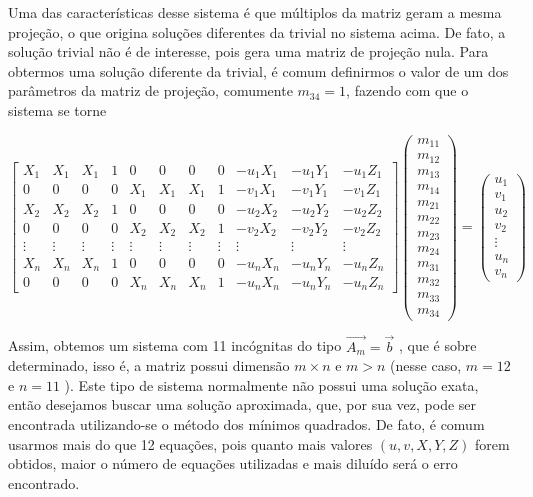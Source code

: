 \documentclass[ecp,tc]{iiufrgs}
\begin{document}
Uma das características desse sistema é que múltiplos da matriz geram a mesma projeção, o que origina soluções diferentes da trivial no sistema acima. De fato, a solução trivial não é de interesse, pois gera uma matriz de projeção nula. Para obtermos uma solução diferente da trivial, é comum definirmos o valor de um dos parâmetros da matriz de projeção, comumente $ m_{34} = 1 $, fazendo com que o sistema se torne

\[
\begin{bmatrix}
X_1 & X_1 & X_1 & 1 & 0 & 0 & 0 & 0 & -u_1X_1 & -u_1Y_1 & -u_1Z_1 \\
0 & 0 & 0 & 0 & X_1 & X_1 & X_1 & 1 & -v_1X_1 & -v_1Y_1 & -v_1Z_1 \\
X_2 & X_2 & X_2 & 1 & 0 & 0 & 0 & 0 & -u_2X_2 & -u_2Y_2 & -u_2Z_2 \\
0 & 0 & 0 & 0 & X_2 & X_2 & X_2 & 1 & -v_2X_2 & -v_2Y_2 & -v_2Z_2 \\
\vdots & \vdots & \vdots & \vdots & \vdots & \vdots & \vdots & \vdots & \vdots & \vdots & \vdots \\
X_n & X_n & X_n & 1 & 0 & 0 & 0 & 0 & -u_nX_n & -u_nY_n & -u_nZ_n \\
0 & 0 & 0 & 0 & X_n & X_n & X_n & 1 & -u_nX_n & -u_nY_n & -u_nZ_n 
\end{bmatrix}
\begin{pmatrix}m_{11} \\ m_{12} \\ m_{13} \\ m_{14} \\ m_{21} \\ m_{22} \\ m_{23} \\ m_{24} \\ m_{31} \\ m_{32} \\ m_{33} \\ m_{34} \end{pmatrix} = \begin{pmatrix} u_1 \\ v_1 \\ u_2 \\ v_2 \\ \vdots \\ u_n \\ v_n \end{pmatrix}
\]

Assim, obtemos um sistema com 11 incógnitas do tipo $ \vec{A_m} = \vec{b} $ , que é sobre determinado, isso é, a matriz possui dimensão $ m \times n $ e $ m > n $ (nesse caso, $ m = 12 $ e $ n = 11$ ). Este tipo de sistema normalmente não possui uma solução exata, então desejamos buscar uma solução aproximada, que, por sua vez, pode ser encontrada utilizando-se o método dos mínimos quadrados. De fato, é comum usarmos mais do que 12 equações, pois quanto mais valores $ (u, v, X, Y, Z) $ forem obtidos, maior o número de equações utilizadas e mais diluído será o erro encontrado.
\end{document}
